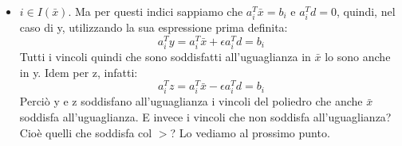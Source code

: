 \begin{itemize}

    \item $i \in I(\bar{x})$. Ma per questi indici sappiamo che $a_i^T\bar{x} = b_i$ e $a_i^Td = 0$, quindi, nel caso di y, utilizzando la sua espressione prima definita:
    \begin{equation*}
        a_i^Ty = a_i^T\bar{x} + \epsilon a_i^T d = b_i
    \end{equation*}
    Tutti i vincoli quindi che sono soddisfatti all'uguaglianza in $\bar{x}$ lo sono anche in y. Idem per z, infatti:
    \begin{equation*}
        a_i^Tz = a_i^T\bar{x} - \epsilon a_i^T d = b_i
    \end{equation*}
        Perciò y e z soddisfano all'uguaglianza i vincoli del poliedro che anche $\bar{x}$ soddisfa all'uguaglianza. E invece i vincoli che non soddisfa all'uguaglianza? Cioè quelli che soddisfa col $>$? Lo vediamo al prossimo punto. 
    

\end{itemize}
